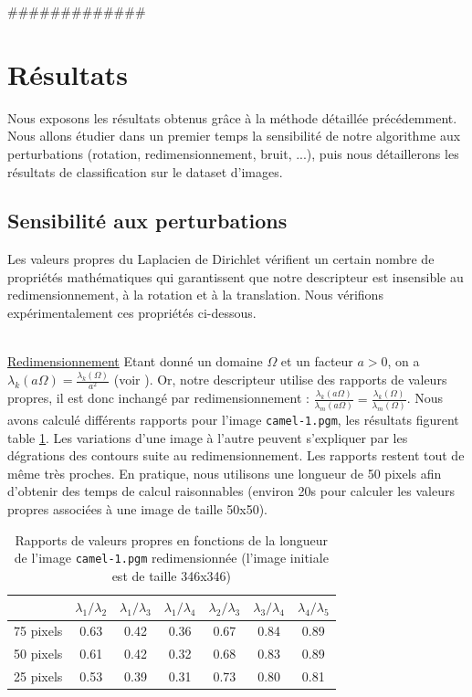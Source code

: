 \documentclass[a4paper,10pt]{article} %
\theoremstyle{definition} %
\begin{document}
#############%

\section{Résultats}

Nous exposons les résultats obtenus grâce à la méthode détaillée précédemment. Nous allons étudier dans un premier temps la sensibilité de notre algorithme aux perturbations (rotation, redimensionnement, bruit, ...), puis nous détaillerons les résultats de classification sur le dataset d'images.


  \subsection{Sensibilité aux perturbations}

Les valeurs propres du Laplacien de Dirichlet vérifient un certain nombre de propriétés mathématiques qui garantissent que notre descripteur est insensible au redimensionnement, à la rotation et à la translation. Nous vérifions expérimentalement ces propriétés ci-dessous.

~\\
\underline{Redimensionnement} Etant donné un domaine $\Omega$ et un facteur $a > 0$, on a $\lambda_k(a \Omega) = \frac{\lambda_k(\Omega)}{a^2}$ (voir \cite{KhabouHR07}). Or, notre descripteur utilise des rapports de valeurs propres, il est donc inchangé par redimensionnement : $\frac{\lambda_k(a \Omega)}{\lambda_m(a \Omega)} = \frac{\lambda_k(\Omega)}{\lambda_m(\Omega)}$. Nous avons calculé différents rapports pour l'image \texttt{camel-1.pgm}, les résultats figurent table \ref{scale}. Les variations d'une image à l'autre peuvent s'expliquer par les dégrations des contours suite au redimensionnement. Les rapports restent tout de même très proches. En pratique, nous utilisons une longueur de 50 pixels afin d'obtenir des temps de calcul raisonnables (environ 20s pour calculer les valeurs propres associées à une image de taille 50x50).

\begin{table}[H]
  \begin{center}
    \begin{tabular}{l | c c c c c c}
                & $\lambda_1 / \lambda_2$ & $\lambda_1 / \lambda_3$ & $\lambda_1 / \lambda_4$ & $\lambda_2 / \lambda_3$ & $\lambda_3 / \lambda_4$ & $\lambda_4 / \lambda_5$ \\ \hline
      75 pixels & 0.63 & 0.42 & 0.36 & 0.67 & 0.84 & 0.89 \\
      50 pixels & 0.61 & 0.42 & 0.32 & 0.68 & 0.83 & 0.89 \\
      25 pixels & 0.53 & 0.39 & 0.31 & 0.73 & 0.80 & 0.81
    \end{tabular}
  \end{center}
\caption{Rapports de valeurs propres en fonctions de la longueur de l'image \texttt{camel-1.pgm} redimensionnée (l'image initiale est de taille 346x346)}
\label{scale}
\end{table}
\end{document}
